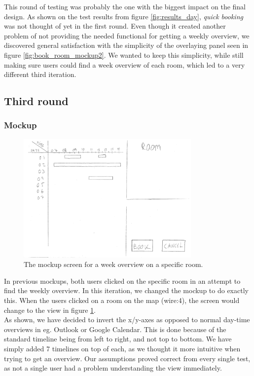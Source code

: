This round of testing was probably the one with the biggest impact on the final design. As shown on the test results from figure \ref{fig:results_day}, \emph{quick booking} was not thought of yet in the first round. Even though it created another problem of not providing the needed functional for getting a weekly overview, we discovered general satisfaction with the simplicity of the overlaying panel seen in figure \ref{fig:book_room_mockup2}. We wanted to keep this simplicity, while still making sure users could find a week overview of each room, which led to a very different third iteration.
\pagebreak

\subsection{Third round}
\label{sec:third_round}
\subsubsection{Mockup}
\begin{figure}[htb]
\begin{center}
\leavevmode
\includegraphics[width=0.8\textwidth]{images/weekMockup}
\end{center}
\caption{The mockup screen for a week overview on a specific room.}
\label{fig:week_mockup}
\end{figure}

In previous mockups, both users clicked on the specific room in an attempt to find the weekly overview.
In this iteration, we changed the mockup to do exactly this. When the users clicked on a room on the map (wire:4), the screen would change to the view in figure \ref{fig:week_mockup}.\\

As shown, we have decided to invert the x/y-axes as opposed to normal day-time overviews in eg. Outlook or Google Calendar. This is done because of the standard timeline being from left to right, and not top to bottom. We have simply added 7 timelines on top of each, as we thought it more intuitive when trying to get an overview. Our assumptions proved correct from every single test, as not a single user had a problem understanding the view immediately.\\

